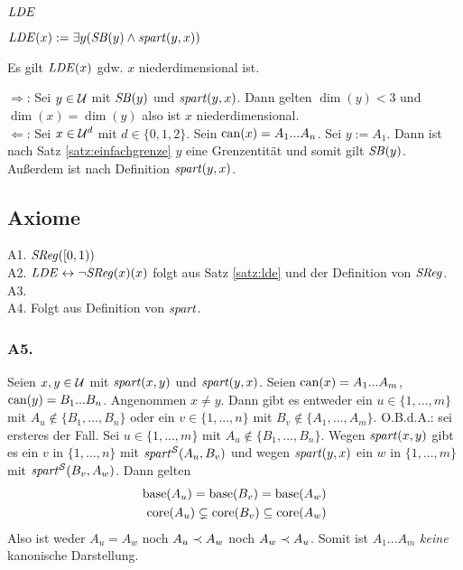 \subsubsection{$\GLDE$}

\begin{erin}[$GLDE$]
    $\mathit{LDE}(x) := \exists y ( \mathit{S\hspace*{-0.25ex}B}(y) \land \mathit{spart}(y,x) )$
\end{erin}

\begin{satz}[$\GLDE$]\label{satz:lde}
    Es gilt $\mathit{LDE}(x)$ gdw. $x$ niederdimensional ist.
\end{satz}

\begin{bew}
    $\boldsymbol{\Rightarrow}$:
    Sei $y \in \mathcal{U}$ mit $\mathit{S\hspace*{-0.25ex}B}(y)$ und $\mathit{spart}(y,x)$. Dann gelten $\dim(y) < 3$ und $\dim(x) = \dim(y)$ also ist $x$ niederdimensional.\\
    $\boldsymbol{\Leftarrow}$: Sei $x \in \mathcal{U}^d$ mit $d \in \{0,1,2\}$.
    Sein $\text{can}(x) = A_1 ... A_n$. Sei $y := A_1$. Dann ist nach Satz \ref{satz:einfachgrenze} $y$ eine Grenzentität und somit gilt $\mathit{S\hspace*{-0.25ex}B}(y)$.
    Außerdem ist nach Definition $\mathit{spart}(y,x)$.
\end{bew}



\subsection{Axiome}
A1. $\mathit{S\hspace*{-0.25ex}Reg}([0,1))$\\
A2. $\mathit{LDE} \leftrightarrow \neg \mathit{S\hspace*{-0.25ex}Reg}(x)(x)$ folgt aus Satz \ref{satz:lde} und der Definition von $\mathit{S\hspace*{-0.25ex}Reg}$.\\
A3.\\
A4. Folgt aus Definition von $\mathit{spart}$.

\subsubsection{A5.}
Seien $x,y \in \mathcal{U}$ mit $\mathit{spart}(x,y)$ und $\mathit{spart}(y,x)$.
Seien $\text{can}(x) = A_1 ... A_m$, $\text{can}(y) = B_1 ... B_n$.
Angenommen $x \neq y$. Dann gibt es entweder ein $u \in \{1, ..., m\}$ mit $A_u \notin \{B_1, ..., B_n\}$ oder ein $v \in \{1, ..., n\}$ mit $B_v \notin \{A_1, ..., A_m\}$.
O.B.d.A.: sei ersteres der Fall.
Sei $u \in \{1, ..., m\}$ mit $A_u \notin \{B_1, ..., B_n\}$.
Wegen $\mathit{spart}(x,y)$ gibt es ein $v$ in $\{1, ..., n\}$ mit $\mathit{spart}^{\mathcal{S}}(A_u,B_v)$ und wegen $\mathit{spart}(y,x)$ ein $w$ in $\{1, ..., m\}$ mit $\mathit{spart}^{\mathcal{S}}(B_v,A_w)$.
Dann gelten
\begin{align*}
    \text{base}(A_u) = \text{base}(B_v) = \text{base}(A_w)\\
    \text{core}(A_u) \subsetneq \text{core}(B_v) \subseteq \text{core}(A_w)
\end{align*}
Also ist weder $A_u = A_w$ noch $A_u \prec A_w$ noch $A_w \prec A_u$. 
Somit ist $A_1 ... A_m$ \textit{keine} kanonische Darstellung.





